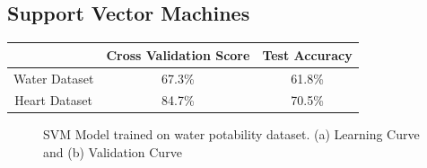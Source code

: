 \documentclass[
	letterpaper, %
]{mlreport}
\begin{document}
\subsection{Support Vector Machines}


\begin{center}
	\begin{tabular}{|c||c|c|}
	 \hline
	  & Cross Validation Score & Test Accuracy \\
	 \hline\hline
	 Water Dataset & 67.3\%  & 61.8\% \\
	 \hline
	 Heart Dataset & 84.7\%  & 70.5\% \\
	 \hline
	\end{tabular}
	\label{table:table4}
\end{center}
\begin{figure}
	\centering
	\caption{SVM Model trained on water potability dataset. (a) Learning Curve and (b) Validation Curve}
	\label{fig:fig10}
\end{figure}
\end{document}
